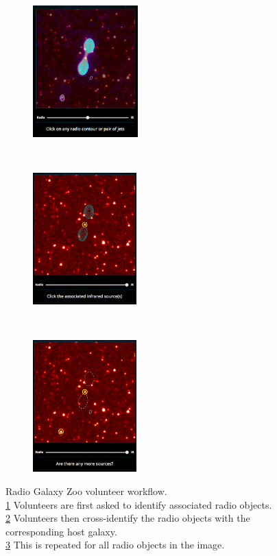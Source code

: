     \begin{figure}[!ht]
        \centering
        \begin{subfigure}[t]{0.3\textwidth}
            \centering
            \includegraphics[height=2in]{images/rgz_radio.png}
            \caption{}
            \label{fig:rgz-interface-a}
        \end{subfigure}%
        ~
        \begin{subfigure}[t]{0.3\textwidth}
            \centering
            \includegraphics[height=2in]{images/rgz_ir.png}
            \caption{}
            \label{fig:rgz-interface-b}
        \end{subfigure}%
        ~
        \begin{subfigure}[t]{0.3\textwidth}
            \centering
            \includegraphics[height=2in]{images/rgz_done.png}
            \caption{}
            \label{fig:rgz-interface-c}
        \end{subfigure}
        \caption{Radio Galaxy Zoo volunteer workflow.\\\ref{fig:rgz-interface-a}
          Volunteers are first asked to identify associated radio objects.
          \\\ref{fig:rgz-interface-b} Volunteers then cross-identify the radio
          objects with the corresponding host galaxy.\\\ref{fig:rgz-interface-c}
          This is repeated for all radio objects in the image.}
        \label{fig:rgz-interface}
    \end{figure}

